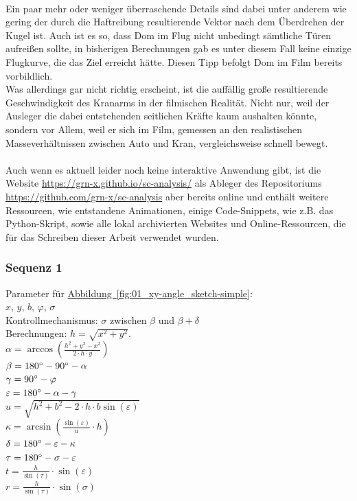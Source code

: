 \\
Ein paar mehr oder weniger überraschende Details sind dabei unter anderem wie gering der durch die Haftreibung resultierende Vektor nach dem Überdrehen der Kugel ist. Auch ist es so, dass Dom im Flug nicht unbedingt sämtliche Türen aufreißen sollte, in bisherigen Berechnungen gab es unter diesem Fall keine einzige Flugkurve, die das Ziel erreicht hätte. Diesen Tipp befolgt Dom im Film bereits vorbildlich.
\\
Was allerdings gar nicht richtig erscheint, ist die auffällig große resultierende Geschwindigkeit des Kranarms in der filmischen Realität. Nicht nur, weil der Ausleger die dabei entstehenden seitlichen Kräfte kaum aushalten könnte, sondern vor Allem, weil er sich im Film, gemessen an den realistischen Masseverhältnissen zwischen Auto und Kran, vergleichsweise schnell bewegt.
\\
\\
Auch wenn es aktuell leider noch keine interaktive Anwendung gibt, ist die Website \url{https://grn-x.github.io/sc-analysis/} als Ableger des Repositoriums \url{https://github.com/grn-x/sc-analysis} aber bereits online und enthält weitere Ressourcen, wie entstandene Animationen, einige Code-Snippets, wie z.B. das Python-Skript, sowie alle lokal archivierten Websites und Online-Ressourcen, die für das Schreiben dieser Arbeit verwendet wurden.  


\iffalse
\subsubsection{Sequenz 1}
Parameter für \hyperref[fig:01_xy-angle_sketch-simple]{Abbildung~\ref*{fig:01_xy-angle_sketch-simple}}: \\
$x$, $y$, $b$, $\varphi$, $\sigma$ \\
Kontrollmechanismus: $\sigma$ zwischen $\beta$ und $\beta + \delta$ 
\\
Berechnungen:
$h=\sqrt{x^2+y^2}$.\\
$\alpha=\arccos(\frac{h^2+y^2-x^2}{2\cdot h\cdot y})$\\
$\beta = 180\degree-90\degree-\alpha$\\
$\gamma=90\degree-\varphi$\\
$\varepsilon=180\degree-\alpha-\gamma$\\
$u=\sqrt{h^2+b^2-2\cdot h \cdot b\sin(\varepsilon)}$\\
$\kappa=\arcsin(\frac{\sin(\varepsilon)}{u}\cdot h)$\\
$\delta=180\degree-\varepsilon-\kappa$\\
$\tau=180\degree-\sigma-\varepsilon$\\
$t=\frac{h}{\sin(\tau)}\cdot\sin(\varepsilon)$\\ 
$r=\frac{h}{\sin(\tau)}\cdot\sin(\sigma)$

